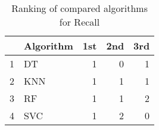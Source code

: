\begin{table}
\footnotesize
\caption{Ranking of compared algorithms for Recall}
\label{tab:places Recall}
\begin{tabular}{llrrr}
\hline
 & Algorithm & 1st & 2nd & 3rd \\
\hline
1 & DT & 1 & 0 & 1 \\
2 & KNN & 1 & 1 & 1 \\
3 & RF & 1 & 1 & 2 \\
4 & SVC & 1 & 2 & 0 \\
\hline
\end{tabular}
\end{table}

